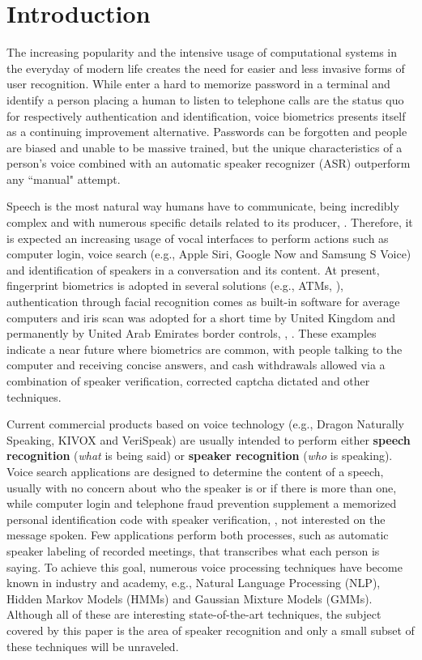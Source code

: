 \chapter{Introduction}
\label{ch:intro}

The increasing popularity and the intensive usage of computational systems in the everyday of modern life creates the need for easier and less invasive forms of user recognition. While enter a hard to memorize password in a terminal and identify a person placing a human to listen to telephone calls are the status quo for respectively authentication and identification, voice biometrics presents itself as a continuing improvement alternative. Passwords can be forgotten and people are biased and unable to be massive trained, but the unique characteristics of a person's voice combined with an automatic speaker recognizer (ASR) outperform any ``manual" attempt.

Speech is the most natural way humans have to communicate, being incredibly complex and with numerous specific details related to its producer, . Therefore, it is expected an increasing usage of vocal interfaces to perform actions such as computer login, voice search (e.g., Apple Siri, Google Now and Samsung S Voice) and identification of speakers in a conversation and its content. At present, fingerprint biometrics is adopted in several solutions (e.g., ATMs, ), authentication through facial recognition comes as built-in software for average computers and iris scan was adopted for a short time by United Kingdom and permanently by United Arab Emirates border controls, , . These examples indicate a near future where biometrics are common, with people talking to the computer and receiving concise answers, and cash withdrawals allowed via a combination of speaker verification, corrected captcha dictated and other techniques.

Current commercial products based on voice technology (e.g., Dragon Naturally Speaking, KIVOX and VeriSpeak) are usually intended to perform either \textbf{speech recognition} (\emph{what} is being said) or \textbf{speaker recognition} (\emph{who} is speaking). Voice search applications are designed to determine the content of a speech, usually with no concern about who the speaker is or if there is more than one, while computer login and telephone fraud prevention supplement a memorized personal identification code with speaker verification, , not interested on the message spoken. Few applications perform both processes, such as automatic speaker labeling of recorded meetings, that transcribes what each person is saying. To achieve this goal, numerous voice processing techniques have become known in industry and academy, e.g., Natural Language Processing (NLP), Hidden Markov Models (HMMs) and Gaussian Mixture Models (GMMs). Although all of these are interesting state-of-the-art techniques, the subject covered by this paper is the area of speaker recognition and only a small subset of these techniques will be unraveled.

